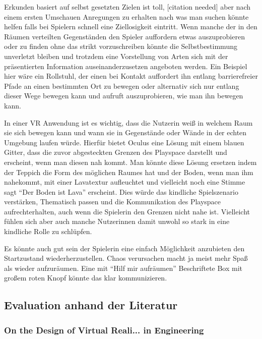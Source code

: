 \documentclass[11pt]{article} %
\begin{document}
Erkunden basiert auf selbst gesetzten Zielen ist toll, [citation needed] aber nach einem ersten Umschauen Anregungen zu erhalten nach was man suchen könnte helfen falls bei Spielern schnell eine Ziellosigkeit eintritt.
Wenn manche der in den Räumen verteilten Gegenständen den Spieler auffordern etwas auszuprobieren oder zu finden ohne das strikt vorzuschreiben könnte die Selbstbestimmung unverletzt bleiben und trotzdem eine Vorstellung von Arten sich mit der präsentierten Information auseinanderzusetzen angeboten werden. Ein Beispiel hier wäre ein Rollstuhl, der einen bei Kontakt auffordert ihn entlang barrierefreier Pfade an einen bestimmten Ort zu bewegen oder alternativ sich nur entlang dieser Wege bewegen kann und aufruft auszuprobieren, wie man ihn bewegen kann. 

In einer VR Anwendung ist es wichtig, dass die Nutzerin weiß in welchem Raum sie sich bewegen kann und wann sie in Gegenstände oder Wände in der echten Umgebung laufen würde. Hierfür bietet Oculus eine Lösung mit einem blauen Gitter, dass die zuvor abgesteckten Grenzen des Playspace %
darstellt und erscheint, wenn man diesen nah kommt. Man könnte diese Lösung ersetzen indem der Teppich die Form des möglichen Raumes hat und der Boden, wenn man ihm nahekommt, mit einer Lavatextur aufleuchtet und vielleicht noch eine Stimme sagt ``Der Boden ist Lava'' erscheint. Dies würde das kindliche Spielszenario verstärken, Thematisch passen und die Kommunikation des Playspace aufrechterhalten, auch wenn die Spielerin den Grenzen nicht nahe ist. Vielleicht fühlen sich aber auch manche Nutzerinnen damit unwohl so stark in eine kindliche Rolle zu schlüpfen. %

Es könnte auch gut sein der Spielerin eine einfach Möglichkeit anzubieten den Startzustand wiederherzustellen. Chaos verursachen macht ja meist mehr Spaß als wieder aufzuräumen. Eine mit ``Hilf mir aufräumen'' Beschriftete Box mit großem roten Knopf könnte das klar kommunizieren.

\subsection{Evaluation anhand der Literatur}

\subsubsection{On the Design of Virtual Reali... in Engineering} %
\end{document}
